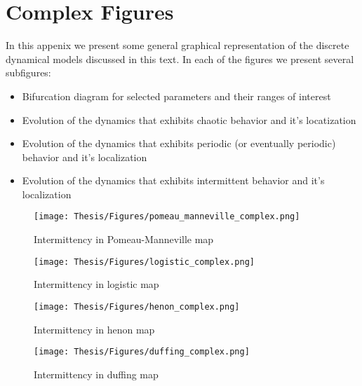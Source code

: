 \chapter{Complex Figures}
\label{sec:Appendix_complex_figures}
In this appenix we present some general graphical representation of the discrete dynamical models discussed in this text.
In each of the figures we present several subfigures:
\begin{itemize}
  \item Bifurcation diagram for selected parameters and their ranges of interest
  \item Evolution of the dynamics that exhibits chaotic behavior and it's locatization
  \item Evolution of the dynamics that exhibits periodic (or eventually periodic) behavior and it's localization
  \item Evolution of the dynamics that exhibits intermittent behavior and it's localization
\end{itemize}

\begin{figure}[!ht]
	\centering
	\texttt{[image: Thesis/Figures/pomeau\_manneville\_complex.png]}
	\caption{Intermittency in Pomeau-Manneville map}
	\label{fig:complex_pomeau_manneville}
\end{figure}

\begin{figure}[!ht]
	\centering
	\texttt{[image: Thesis/Figures/logistic\_complex.png]}
	\caption{Intermittency in logistic map}
	\label{fig:complex_logistic}
\end{figure}

\begin{figure}[!ht]
	\centering
	\texttt{[image: Thesis/Figures/henon\_complex.png]}
	\caption{Intermittency in henon map}
	\label{fig:complex_henon}
\end{figure}

\begin{figure}[!ht]
	\centering
	\texttt{[image: Thesis/Figures/duffing\_complex.png]}
	\caption{Intermittency in duffing map}
	\label{fig:complex_duffing}
\end{figure}

\endinput